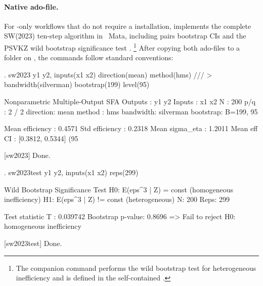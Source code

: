 \documentclass[article]{jss}
\begin{document}
\paragraph{Native ado-file.}
\begin{sloppypar}
For -only workflows that do not require a
 installation,  implements the
complete SW(2023) ten-step algorithm in ~Mata,
including pairs bootstrap CIs \citep{SimarWilson2023} and the
PSVKZ wild bootstrap significance test \citep{PSVKZ2024}.%
\footnote{The companion command  performs the wild
  bootstrap test for heterogeneous inefficiency and is defined in
  the self-contained .}
After copying both ado-files to a folder on ,
the commands follow standard  conventions:
\end{sloppypar}
%
\begin{CodeChunk}
\begin{CodeInput}
. sw2023 y1 y2, inputs(x1 x2) direction(mean) method(hms)  ///
>               bandwidth(silverman) bootstrap(199) level(95)
\end{CodeInput}
\begin{CodeOutput}
[sw2023] Nonparametric Multiple-Output SFA
  Outputs  : y1 y2   Inputs : x1 x2   N : 200   p/q : 2 / 2
  direction: mean    method : hms      bandwidth: silverman
  bootstrap: B=199, 95%

  Mean efficiency : 0.4571
  Std  efficiency : 0.2318
  Mean sigma_eta  : 1.2011
  Mean eff CI     : [0.3812, 0.5344]  (95%

[sw2023] Done.
\end{CodeOutput}
\end{CodeChunk}
%
\begin{CodeChunk}
\begin{CodeInput}
. sw2023test y1 y2, inputs(x1 x2) reps(299)
\end{CodeInput}
\begin{CodeOutput}
[sw2023test] Wild Bootstrap Significance Test
  H0: E(eps^3 | Z) = const  (homogeneous inefficiency)
  H1: E(eps^3 | Z) != const (heterogeneous)
  N: 200   Reps: 299

  Test statistic T :   0.039742
  Bootstrap p-value:   0.8696
  => Fail to reject H0: homogeneous inefficiency

[sw2023test] Done.
\end{CodeOutput}
\end{CodeChunk}
%
\end{document}
